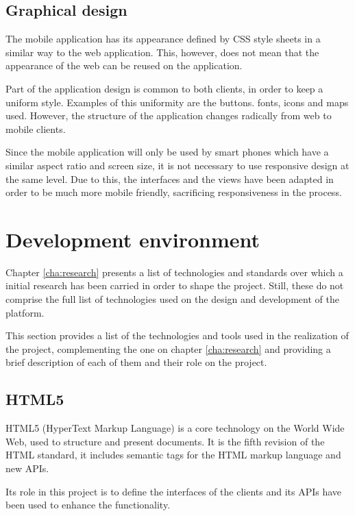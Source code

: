 \subsection{Graphical design}

The mobile application has its appearance defined by CSS style sheets in a similar way to the web application. This, however, does not mean that the appearance of the web can be reused on the application.

Part of the application design is common to both clients, in order to keep a uniform style. Examples of this uniformity are the buttons. fonts, icons and maps used. However, the structure of the application changes radically from web to mobile clients.

Since the mobile application will only be used by smart phones which have a similar aspect ratio and screen size, it is not necessary to use responsive design at the same level. Due to this, the interfaces and the views have been adapted in order to be much more mobile friendly, sacrificing responsiveness in the process.

\FloatBarrier
\section{Development environment}

Chapter \ref{cha:research} presents a list of technologies and standards over which a initial research has been carried in order to shape the project. Still, these do not comprise the full list of technologies used on the design and development of the platform.

This section provides a list of the technologies and tools used in the realization of the project, complementing the one on chapter \ref{cha:research} and providing a brief description of each of them and their role on the project.

\subsection*{HTML5}

HTML5 (HyperText Markup Language)\cite{html5} is a core technology on the World Wide Web, used to structure and present documents. It is the fifth revision of the HTML standard, it includes semantic tags for the HTML markup language and new APIs.

Its role in this project is to define the interfaces of the clients and its APIs have been used to enhance the functionality.

